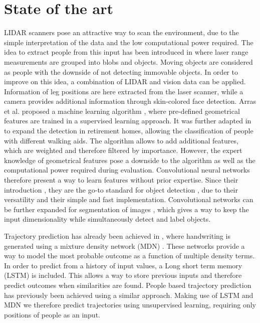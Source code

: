 \section{State of the art}

LIDAR scanners pose an attractive way to scan the environment, due to the simple interpretation of the data and the low computational power required.
The idea to extract people from this input has been introduced in \cite{1013691} where laser range measurements are grouped into blobs and objects. 
Moving objects are considered as people with the downside of not detecting immovable objects.
In order to improve on this idea, a combination of LIDAR and vision data \cite{kleinehagenbrock2002person} can be applied. Information of leg positions are here extracted from the laser scanner, while a camera provides additional information through skin-colored face detection. 
Arras et al. proposed a machine learning algorithm \cite{Arras07usingboosted}, where pre-defined geometrical features are trained in a supervised learning approach. 
It was further adapted in \cite{weinrich2014people} to expand the detection in retirement homes, allowing the classification of people with different walking aids. 
The algorithm allows to add additional features, which are weighted and therefore filtered by importance.
However, the expert knowledge of geometrical features pose a downside to the algorithm as well as the computational power required during evaluation. Convolutional neural networks therefore present a way to learn features without prior expertise. Since their introduction \cite{lecun_gradient-based_1998}, they are the go-to standard for object detection \cite{krizhevsky_imagenet_2012}, due to their versatility and their simple and fast implementation. Convolutional networks can be further expanded for segmentation of images \cite{long2015fully}, which gives a way to keep the input dimensionality while simultaneously detect and label objects.

Trajectory prediction has already been achieved in \cite{graves2013generating}, where handwriting is generated using a mixture density network (MDN) \cite{bishop1994mixture}. These networks provide a way to model the most probable outcome as a function of multiple density terms. In order to predict from a history of input values, a Long short term memory (LSTM) \cite{hochreiter1997long} is included. This allows a way to store previous inputs and therefore predict outcomes when similarities are found. People based trajectory prediction has previously been achieved \cite{alahi2016social} using a similar approach. Making use of LSTM and MDN we therefore predict trajectories using unsupervised learning, requiring only positions of people as an input.




